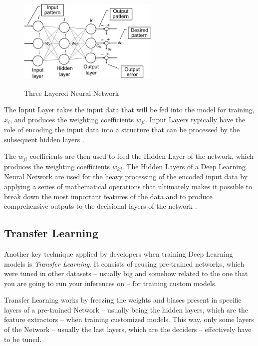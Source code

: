 \begin{figure}[H]
	\centering
	\caption[Three Layered Neural Network]{Three Layered Neural Network}
    \includegraphics[width=0.6\textwidth]{./images/three-layered-ann.jpg}
	\label{fig:threeLayeredAnn}
\end{figure}

The Input Layer takes the input data that will be fed into the model for training,
$x_i$, and produces the weighting coefficients $w_{ji}$. Input Layers
typically have the role of encoding the input data into a structure that can be processed by the 
subsequent hidden layers \cite{Paranjape2020}.

The $w_{ji}$ coefficients are then used to feed the Hidden Layer of the network,
which produces the weighting coefficients $w_{kj}$. The Hidden Layers of a Deep Learning 
Neural Network are used for the heavy processing of the encoded input data by applying a series of 
mathematical operations that ultimately makes it possible to break down the most important features
of the data and to produce comprehensive outputs to the decisional layers of the network
\cite{DeepAI_HiddenLayer}.

\subsection{Transfer Learning}

Another key technique applied by developers when training Deep Learning models is
\textit{Transfer Learning}. 
It consists of reusing pre-trained networks, which were tuned in other datasets -- usually big and
somehow related to the one that you are going to run your inferences on -- for training custom models.

Transfer Learning works by freezing the weights and biases present in specific layers of a
pre-trained Network -- usually being the hidden layers, which are the feature extractors -- 
when training customized models. This way,  only some layers of the Network -- usually the last layers, which 
are the deciders -- effectively have to be tuned.

